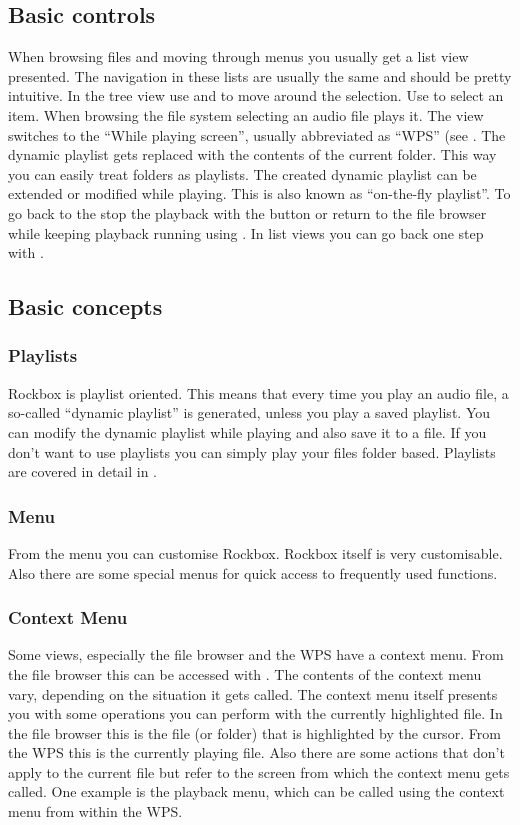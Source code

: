 \subsection{Basic controls}
When browsing files and moving through menus you usually get a list view
presented. The navigation in these lists are usually the same and should be
pretty intuitive.
In the tree view use \ActionStdNext{} and \ActionStdPrev{} to move around
the selection. Use \ActionStdOk{} to select an item. When browsing the file
system selecting an audio file plays it. The view switches to the ``While
playing screen'', usually abbreviated as ``WPS'' (see . The
dynamic playlist gets replaced with the contents of the current folder. This
way you can easily treat folders as playlists. The created dynamic playlist can
be extended or modified while playing. This is also known as
``on-the-fly playlist''.
To go back to the  stop the playback with the
\ActionWpsStop{} button or return to the file browser while keeping playback
running using \ActionWpsBrowse{}.
In list views you can go back one step with \ActionTreeParentDirectory.

\subsection{Basic concepts}
\subsubsection{Playlists}
Rockbox is playlist oriented. This means that every time you play an audio file,
a so-called ``dynamic playlist'' is generated, unless you play a saved
playlist. You can modify the dynamic playlist while playing and also save
it to a file. If you don't want to use playlists you can simply play your
files folder based.
Playlists are covered in detail in .

\subsubsection{Menu}
From the menu you can customise Rockbox. Rockbox itself is very customisable.
Also there are some special menus for quick access to frequently used
functions.

\subsubsection{Context Menu}
Some views, especially the file browser and the WPS have a context menu.
From the file browser this can be accessed with \ActionStdContext{}.
The contents of the context menu vary, depending on the situation it gets
called. The context menu itself presents you with some operations you can
perform with the currently highlighted file. In the file browser this is
the file (or folder) that is highlighted by the cursor. From the WPS this is
the currently playing file. Also there are some actions that don't apply
to the current file but refer to the screen from which the context menu
gets called. One example is the playback menu, which can be called using
the context menu from within the WPS.

